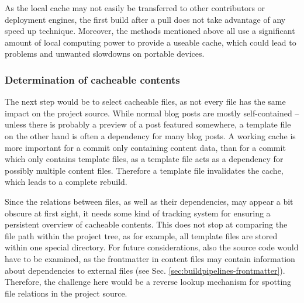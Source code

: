 As the local cache may not easily be transferred to other contributors or deployment engines, the first build after a pull does not take advantage of any speed up technique. Moreover, the methods mentioned above all use a significant amount of local computing power to provide a useable cache, which could lead to problems and unwanted slowdowns on portable devices.

\subsubsection{Determination of cacheable contents}
\label{sec:challenges-cachedetermination}
The next step would be to select cacheable files, as not every file has the same impact on the project source. While normal blog posts are mostly self-contained --  unless there is probably a preview of a post featured somewhere, a template file on the other hand is often a dependency for many blog posts. A working cache is more important for a commit only containing content data, than for a commit which only contains template files, as a template file acts as a dependency for possibly multiple content files. Therefore a template file invalidates the cache, which leads to a complete rebuild.

Since the relations between files, as well as their dependencies, may appear a bit obscure at first sight, it needs some kind of tracking system for ensuring a persistent overview of cacheable contents. This does not stop at comparing the file path within the project tree, as for example, all template files are stored within one special directory. For future considerations, also the source code would have to be examined, as the frontmatter in content files may contain information about dependencies to external files (see Sec. \ref{sec:buildpipelines-frontmatter}). Therefore, the challenge here would be a reverse lookup mechanism for spotting file relations in the project source.
